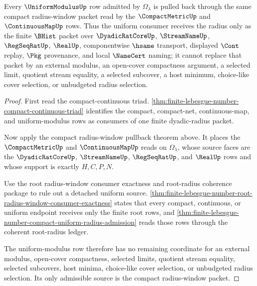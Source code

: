 \begin{theorem}
\label{thm:finite-lebesgue-number-uniform-modulus-consumer-pullback}
Every $\UniformModulusUp$ row admitted by $\Omega_{\lambda}$ is pulled back through the same compact radius-window packet read by the $\CompactMetricUp$ and $\ContinuousMapUp$ rows. Thus the uniform consumer receives the radius only as the finite $\BHist$ packet over $\DyadicRatCoreUp$, $\StreamNameUp$, $\RegSeqRatUp$, $\RealUp$, componentwise $\hsame$ transport, displayed $\Cont$ replay, $\Pkg$ provenance, and local $\NameCert$ naming; it cannot replace that packet by an external modulus, an open-cover compactness argument, a selected limit, quotient stream equality, a selected subcover, a host minimum, choice-like cover selection, or unbudgeted radius selection.
\end{theorem}
\begin{proof}
First read the compact-continuous triad. \autoref{thm:finite-lebesgue-number-compact-continuous-triad} identifies the compact, compact-net, continuous-map, and uniform-modulus rows as consumers of one finite dyadic-radius packet.

Now apply the compact radius-window pullback theorem above. It places the $\CompactMetricUp$ and $\ContinuousMapUp$ reads on $\Omega_{\lambda}$, whose source faces are the $\DyadicRatCoreUp$, $\StreamNameUp$, $\RegSeqRatUp$, and $\RealUp$ rows and whose support is exactly $H,C,P,N$.

Use the root radius-window consumer exactness and root-radius coherence package to rule out a detached uniform source. \autoref{thm:finite-lebesgue-number-root-radius-window-consumer-exactness} states that every compact, continuous, or uniform endpoint receives only the finite root rows, and \autoref{thm:finite-lebesgue-number-compact-uniform-radius-admission} reads those rows through the coherent root-radius ledger.

The uniform-modulus row therefore has no remaining coordinate for an external modulus, open-cover compactness, selected limits, quotient stream equality, selected subcovers, host minima, choice-like cover selection, or unbudgeted radius selection. Its only admissible source is the compact radius-window packet.
\end{proof}

